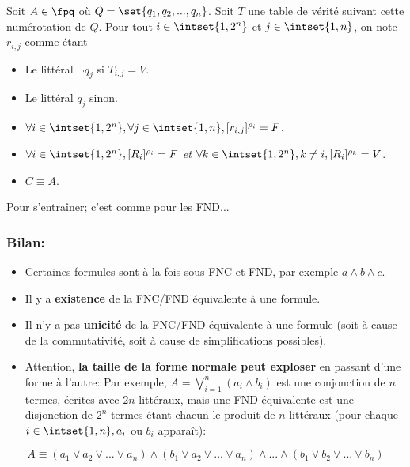 \documentclass{scrartcl}
\begin{document}
				Soit $A \in \fpq$ où $Q = \set{q_1,q_2,..., q_n}$. Soit $T$ une table de vérité suivant cette numérotation de $Q$.
				Pour tout $i \in \intset{1,2^n}$ et $j \in \intset{1,n}$, on note $r_{i,j}$ comme étant
				\vspace{5pt}
				\begin{itemize}
					\item Le littéral $\neg q_j$ si $T_{i,j} = V$.
					\item Le littéral $q_j$ sinon.
				\end{itemize}
				\vspace{5pt}

				\begin{itemize}
					\item $\forall i \in \intset{1,2^n}, \forall j \in \intset{1,n}, [r_{i,j}]^{\rho_i} = F$.
					\item $\forall i \in \intset{1,2^n}, [R_i]^{\rho_i} = F$ \textsl{et} $\forall k \in \intset{1,2^n}, k \neq i, [R_i]^{\rho_k} = V$.
					\item $C \equiv A$.
				\end{itemize}
				\begin{demo}
					\item Pour s'entraîner; c'est comme pour les FND...
				\end{demo}

			\subsubsection{Bilan:}
				\begin{itemize}
					\item Certaines formules sont à la fois sous FNC et FND, par exemple $a \wedge b \wedge c$.
					\item Il y a \textbf{existence} de la FNC/FND équivalente à une formule.
					\item Il n'y a pas \textbf{unicité} de la FNC/FND équivalente à une formule (soit à cause de la commutativité, soit à cause de simplifications possibles).
					\item Attention, \textbf{la taille de la forme normale peut exploser} en passant d'une forme à l'autre:
						Par exemple, $A = \bigvee_{i=1}^n (a_i\wedge b_i)$ est une conjonction de $n$ termes, écrites avec $2n$ littéraux,
						mais une FND équivalente est une disjonction de $2^n$ termes étant chacun le produit de $n$ littéraux 
						(pour chaque $i\in \intset{1,n}, a_i$ ou $b_i$ apparaît):
				\end{itemize}
				\[
					A \equiv (a_1 \vee a_2 \vee ... \vee a_n) \wedge (b_1 \vee a_2 \vee ... \vee a_n) \wedge ... \wedge (b_1 \vee b_2 \vee ... \vee b_n)
				\]
\end{document}

